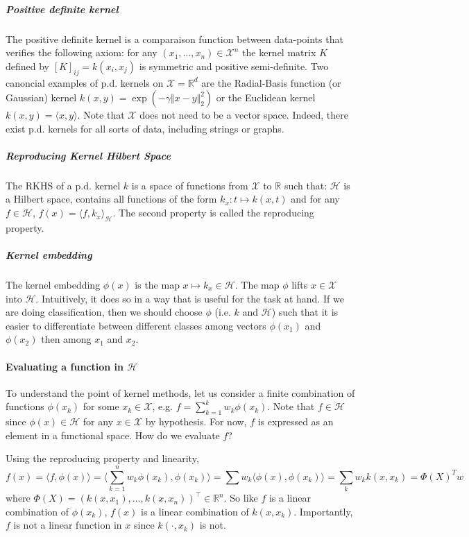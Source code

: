 \subparagraph{Positive definite kernel}
The positive definite kernel is a comparaison function between data-points that verifies the following axiom: for any $(x_1, \ldots, x_n)\in\mathcal X^n$ the kernel matrix $K$ defined by $[K]_{ij} = k(x_i, x_j)$ is symmetric and positive semi-definite. Two canoncial examples of p.d. kernels on $\mathcal X = \mathbb R^d$ are the Radial-Basis function (or Gaussian) kernel $k(x, y) = \exp(-\gamma \Vert x - y \Vert_2^2)$ or the Euclidean kernel $k(x, y) = \langle x, y \rangle$. Note that $\mathcal X$ does not need to be a vector space. Indeed, there exist p.d. kernels for all sorts of data, including strings or graphs.

\subparagraph{Reproducing Kernel Hilbert Space}
The RKHS of a p.d. kernel $k$ is a space of functions from $\mathcal X$ to $\mathbb R$ such that: $\mathcal H$ is a Hilbert space, contains all functions of the form $k_x: t\mapsto k(x, t)$ and for any $f\in\mathcal H$, $f(x) = \langle f, k_x\rangle_\mathcal H$. The second property is called the reproducing property.

\subparagraph{Kernel embedding}
The kernel embedding $\phi(x)$ is the map $x \mapsto k_x\in\mathcal H$. The map $\phi$ lifts $x\in\mathcal X$ into $\mathcal H$. Intuitively, it does so in a way that is useful for the task at hand. If we are doing classification, then we should choose $\phi$ (i.e. $k$ and $\mathcal H$) such that it is easier to differentiate between different classes among vectors $\phi(x_1)$ and $\phi(x_2)$ then among $x_1$ and $x_2$. %

\paragraph{Evaluating a function in $\mathcal H$}
To understand the point of kernel methods, let us consider a finite combination of functions $\phi(x_k)$ for some $x_k\in\mathcal X$, e.g. $f= \sum_{k=1}^k w_k \phi(x_k)$. Note that $f\in\mathcal H$ since $\phi(x)\in\mathcal H$ for any $x\in\mathcal X$ by hypothesis. For now, $f$ is expressed as an element in a functional space. How do we evaluate $f$?

Using the reproducing property and linearity,
$$f(x) = \langle f, \phi(x)\rangle = \langle \sum_{k=1}^n w_k\phi(x_k), \phi(x_k)\rangle= \sum w_k \langle \phi(x), \phi(x_k)\rangle = \sum_{k}w_k k(x, x_k)= \Phi(X)^Tw$$
where $\Phi(X) = (k(x, x_1), \ldots, k(x, x_n))^\top\in\mathbb R^n$. So like $f$ is a linear combination of $\phi(x_k)$, $f(x)$ is a linear combination of $k(x, x_k)$. Importantly, $f$ is not a linear function in $x$ since $k(\cdot, x_k)$ is not.

